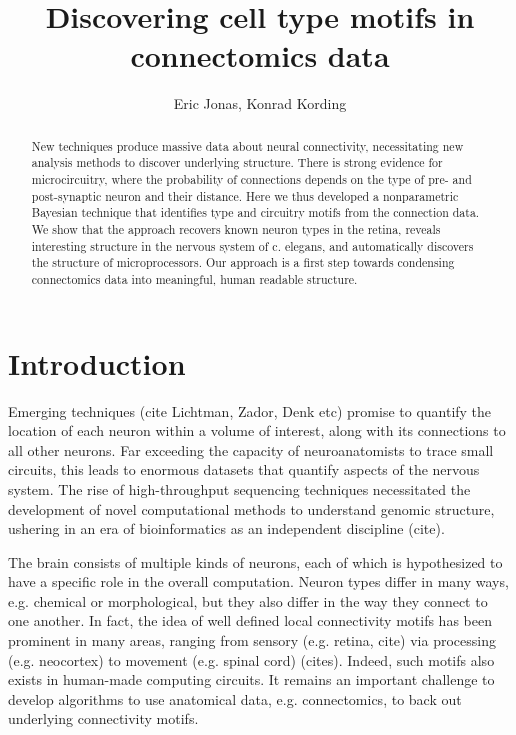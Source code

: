 \documentclass{nature}
\title{Discovering cell type motifs in connectomics data}
\author{Eric Jonas, Konrad Kording}
\begin{document}
\maketitle


\begin{abstract}
  New techniques produce massive data about neural connectivity,
  necessitating new analysis methods to discover underlying
  structure. There is strong evidence for microcircuitry, where the
  probability of connections depends on the type of pre- and
  post-synaptic neuron and their distance. Here we thus developed a
  nonparametric Bayesian technique that identifies type and circuitry
  motifs from the connection data. We show that the approach recovers
  known neuron types in the retina, reveals interesting structure in
  the nervous system of c. elegans, and automatically discovers the
  structure of microprocessors. Our approach is a first step towards
  condensing connectomics data into meaningful, human readable
  structure.
\end{abstract}

\section*{Introduction}
Emerging techniques (cite Lichtman, Zador, Denk etc) promise to
quantify the location of each neuron within a volume of interest,
along with its connections to all other neurons. Far exceeding the
capacity of neuroanatomists to trace small circuits, this leads to
enormous datasets that quantify aspects of the nervous system. The
rise of high-throughput sequencing techniques necessitated the
development of novel computational methods to understand genomic
structure, ushering in an era of bioinformatics as an independent
discipline (cite).




The brain consists of multiple kinds of neurons, each of which is
hypothesized to have a specific role in the overall
computation. Neuron types differ in many ways, e.g. chemical or
morphological, but they also differ in the way they connect to one
another. In fact, the idea of well defined local connectivity motifs
has been prominent in many areas, ranging from sensory (e.g. retina,
cite) via processing (e.g. neocortex) to movement (e.g. spinal cord)
(cites). Indeed, such motifs also exists in human-made computing
circuits. It remains an important challenge to develop algorithms to
use anatomical data, e.g. connectomics, to back out underlying
connectivity motifs.
\end{document}
